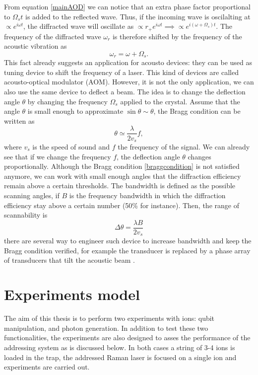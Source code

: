 From equation \eqref{mainAOD} we can notice that an extra phase factor proportional to $\Omega_s t$ is added to the reflected wave. Thus, if the incoming wave is oscilalting at $\propto e^{i\omega t}$, the diffracted wave will oscillate as $\propto r_{+}e^{i\omega t} \implies \propto e^{i(\omega + \Omega_s )t}$. The frequency of the diffracted wave $\omega_r$ is therefore shifted by the frequency of the acoustic vibration as
\begin{equation}
\omega_r  =  \omega + \Omega_s.
\end{equation}
This fact already suggests an application for acousto devices: they can be used as tuning device to shift the frequency of a laser. This kind of devices are called acousto-optical modulator (AOM). However, it is not the only application, we can also use the same device to deflect a beam. The idea is to change the deflection angle $\theta$ by changing the frequency $\Omega_s$ applied to the crystal.
Assume that the angle $\theta$ is small enough to approximate $\sin\theta \sim \theta$, the Bragg condition can be written as
\begin{equation}
\theta \simeq \frac{\lambda}{2 v_s}f,
\end{equation}
where $v_s$ is the speed of sound and $f$ the frequency of the signal. We can already see that if we change the frequency $f$, the deflection angle $\theta$ changes proportionally. Although the Bragg condition \eqref{braggcondition} is not satisfied anymore, we can work with small enough angles that the diffraction efficiency remain above a certain thresholds. The bandwidth is defined as the possible scanning angles, if $B$ is the frequency bandwidth in which the diffraction efficiency stay above a certain number (50\% for instance). Then, the range of scannability is
\begin{equation}
\Delta\theta = \frac{\lambda B}{2v_s}
\end{equation}
there are several way to engineer such device to increase bandwidth and keep the Bragg condition verified, for example the transducer is replaced by a phase array of transducers that tilt the acoustic beam \cite{phasedarray}.

\section{Experiments model}
The aim of this thesis is to perform two experiments with ions: qubit manipulation, and photon generation. In addition to test these two functionalities, the experiments are also designed to asses the performance of the addressing system as is discussed below. In both cases a string of 3-4 ions is loaded in the trap, the addressed Raman laser is focused on a single ion and experiments are carried out.

